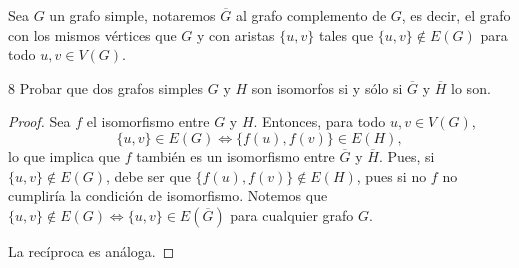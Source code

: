 \begin{definition}\label{def:complemento}
    Sea \( G \) un grafo simple, notaremos \( \overline{G} \) al grafo complemento de \( G \), es decir, el grafo con los mismos vértices que \( G \) y con aristas \( \{u,v\} \) tales que \( \{u,v\} \notin E(G) \) para todo \( u,v \in V(G) \).
\end{definition}

\begin{ejercicio}{8}
    Probar que dos grafos simples \( G \) y \( H \) son isomorfos si y sólo si \( \overline{G} \) y \( \overline{H} \) lo son.
\end{ejercicio}
\begin{proof}
    Sea \( f \) el isomorfismo entre \( G \) y \( H \). Entonces, para todo \( u,v \in V(G) \),
    \[
        \{u,v\} \in E(G) \iff \{f(u), f(v)\} \in E(H),
    \]
    lo que implica que \( f \) también es un isomorfismo entre \( \overline{G} \) y \( \overline{H} \).
    Pues, si \( \{ u, v \} \notin E(G) \), debe ser que \( \{ f(u), f(v) \} \notin E(H) \), pues si no \( f \) no cumpliría la condición de isomorfismo. Notemos que \( \{ u, v \} \notin E(G) \iff \{ u, v \} \in E\left(\overline{G}\right) \) para cualquier grafo \( G \).

    La recíproca es análoga.
\end{proof}

\vspace{0.5cm}

